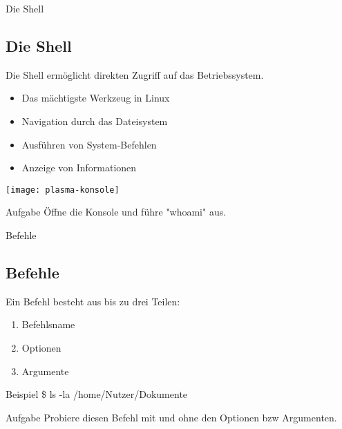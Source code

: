 \begin{frame}{Die Shell}
    \subsection{Die Shell}\label{subsec:die-shell}

    Die Shell ermöglicht direkten Zugriff auf das Betriebssystem.
    \pause

    \begin{itemize}
        \item Das mächtigste Werkzeug in Linux\pause
        \item Navigation durch das Dateisystem\pause
        \item Ausführen von System-Befehlen\pause
        \item Anzeige von Informationen
    \end{itemize}
    \pause

    \vspace{0.5cm}
    \texttt{[image: plasma-konsole]}
    \pause

    \vspace{0.5cm}
    \begin{alertblock}{Aufgabe}
        Öffne die Konsole und führe "whoami" aus.
    \end{alertblock}

\end{frame}

\begin{frame}{Befehle}
    \subsection{Befehle}\label{subsec:befehle}

    Ein Befehl besteht aus bis zu drei Teilen:
    \pause

    \begin{enumerate}
        \item Befehlsname\pause
        \item Optionen\pause
        \item Argumente
    \end{enumerate}
    \pause

    \vspace{0.5cm}
    \begin{exampleblock}{Beispiel}
        \$ ls -la /home/Nutzer/Dokumente
    \end{exampleblock}
    \pause

    \vspace{0.5cm}
    \begin{alertblock}{Aufgabe}
        Probiere diesen Befehl mit und ohne den Optionen bzw Argumenten.
    \end{alertblock}

\end{frame}

